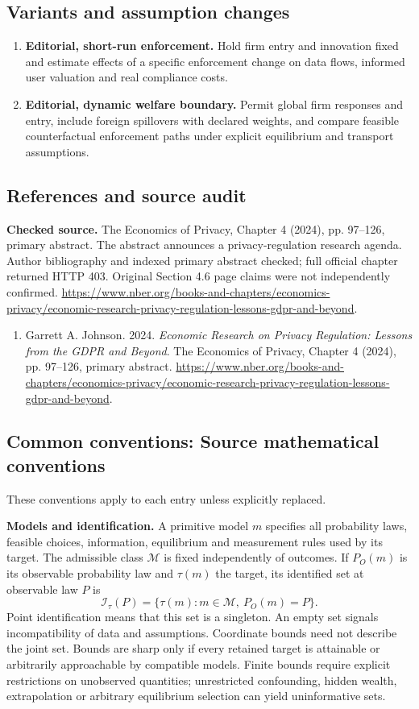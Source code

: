 \documentclass[11pt,a4paper]{article}
\begin{document}
\subsection*{Variants and assumption changes}
\begin{enumerate}
\item \textbf{Editorial, short-run enforcement.} Hold firm entry and innovation fixed and estimate effects of a specific enforcement change on data flows, informed user valuation and real compliance costs.
\item \textbf{Editorial, dynamic welfare boundary.} Permit global firm responses and entry, include foreign spillovers with declared weights, and compare feasible counterfactual enforcement paths under explicit equilibrium and transport assumptions.
\end{enumerate}
\subsection*{References and source audit}
\textbf{Checked source.} The Economics of Privacy, Chapter 4 (2024), pp. 97--126, primary abstract. The abstract announces a privacy-regulation research agenda. Author bibliography and indexed primary abstract checked; full official chapter returned HTTP 403. Original Section 4.6 page claims were not independently confirmed. \url{https://www.nber.org/books-and-chapters/economics-privacy/economic-research-privacy-regulation-lessons-gdpr-and-beyond}.
\begin{enumerate}\raggedright
\item\hypertarget{definitions:source:30007690:1}{} Garrett A. Johnson. 2024. \emph{Economic Research on Privacy Regulation: Lessons from the GDPR and Beyond}. The Economics of Privacy, Chapter 4 (2024), pp. 97--126, primary abstract.
\url{https://www.nber.org/books-and-chapters/economics-privacy/economic-research-privacy-regulation-lessons-gdpr-and-beyond}.
\end{enumerate}

\subsection*{Common conventions: Source mathematical conventions}

These conventions apply to each entry unless explicitly replaced.

\textbf{Models and identification.} A primitive model \(m\) specifies all probability laws, feasible choices, information, equilibrium and measurement rules used by its target. The admissible class \(\mathcal M\) is fixed independently of outcomes. If \(P_O(m)\) is its observable probability law and \(\tau(m)\) the target, its identified set at observable law \(P\) is
\[
 \mathcal I_\tau(P)=\{\tau(m):m\in\mathcal M,\ P_O(m)=P\}.
\]
Point identification means that this set is a singleton. An empty set signals incompatibility of data and assumptions. Coordinate bounds need not describe the joint set. Bounds are sharp only if every retained target is attainable or arbitrarily approachable by compatible models. Finite bounds require explicit restrictions on unobserved quantities; unrestricted confounding, hidden wealth, extrapolation or arbitrary equilibrium selection can yield uninformative sets.
\end{document}
